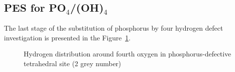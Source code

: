 \subsection{PES for PO$_4$/(OH)$_4$ }

The last stage of the substitution of phosphorus by four hydrogen defect investigation is presented in the Figure~\ref{HinO1,2,3and4}. 

\begin{figure}[h]
\begin{minipage}[h]{0.5\linewidth}
\end{minipage}
\hfill
\begin{minipage}[h]{0.5\linewidth}
\end{minipage}
\caption{Hydrogen distribution around fourth oxygen in phosphorus-defective tetrahedral site (2 grey number)}
\label{HinO1,2,3and4}
\end{figure}

